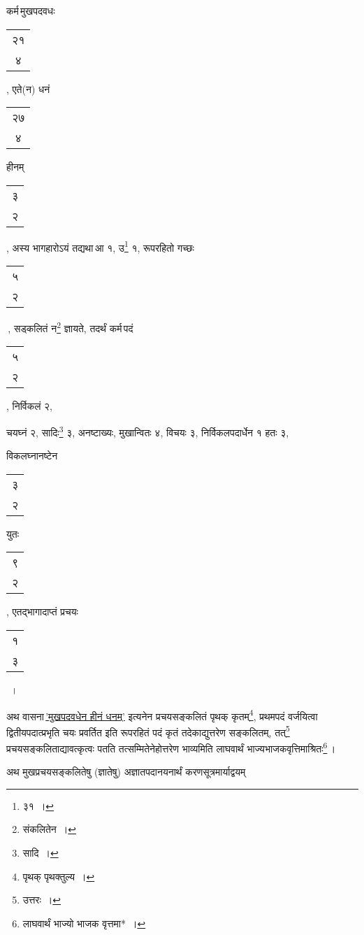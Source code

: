 \documentclass[10pt, openany]{book}
\begin{document}
{{{{{{{{{कर्म\textendash \,मुखपदवधः\begin{tabular}{c}२१\\ ४\end{tabular}, एते(न) धनं \begin{tabular}{|c|}२७\\ ४\\\hline \end{tabular} 
हीनम्\begin{tabular}{c}३ \\२\end{tabular}, अस्य भागहारोऽयं तद्यथा\textendash \,आ १, उ\renewcommand{\thefootnote}{६}\footnote{३१~।} १, रूपरहितो गच्छः \begin{tabular}{c|}५ \\२\\\hline \end{tabular}\,, सड्कलितं न\renewcommand{\thefootnote}{७}\footnote{संकलितेन~।} ज्ञायते,
तदर्थं कर्म\textendash \,पदं\begin{tabular}{c}५ \\२\end{tabular}, निर्विकलं २,}
{चयघ्नं २, सादिः\renewcommand{\thefootnote}{८}\footnote{सादि~।} ३, अनष्टाख्यः, मुखान्वितः ४, विचयः ३,
निर्विकलपदार्धेन १ हतः ३,}
{विकलघ्नानष्टेन\begin{tabular}{c}३\\ २\end{tabular}युतः\begin{tabular}{c}९ \\२\end{tabular}, एतद्भागादाप्तं प्रचयः \begin{tabular}{|c|} १\\ ३\\\hline \end{tabular}}~। 
\vspace{3mm}

{अथ वासना\textendash \,\hyperref[91]{'मुखपदवधेन हीनं धनम्'} इत्यनेन प्रचयसङ्कलितं पृथक् कृतम्\renewcommand{\thefootnote}{९}\footnote{पृथक् पृथक्तुल्य~।},
प्रथमपदं}
{वर्जयित्वा द्वितीयपदात्प्रभृति चयः प्रवर्तित इति रूपरहितं पदं कृतं
तदेकाद्युत्तरेण सङ्कलितम्,}
{तत्\renewcommand{\thefootnote}{१०}\footnote{उत्तरः~।} प्रचयसङ्कलिताद्यावत्कृत्वः पतति तत्सम्मितेनेहोत्तरेण
भाव्यमिति लाघवार्थं भाज्यभाजकवृत्तिमाश्रितः\renewcommand{\thefootnote}{११}\footnote{लाघवार्थं
भाज्यो भाजक वृत्तमा*~।}\,।}
\vspace{3mm}

{अथ मुखप्रचयसङ्कलितेषु (ज्ञातेषु) अज्ञातपदानयनार्थं
करणसूत्रमार्याद्वयम्\textendash}

}}}}}}}}
\end{document}
